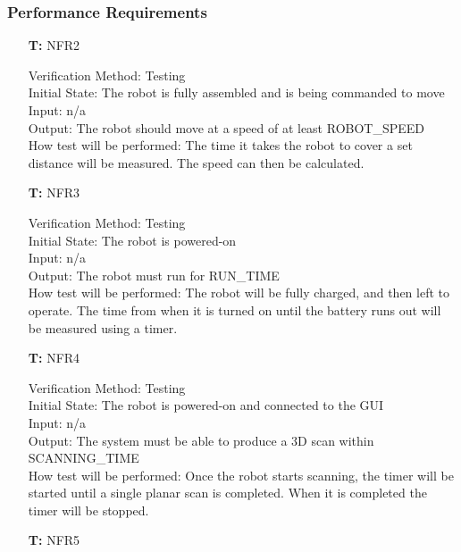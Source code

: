 \documentclass[12pt, titlepage]{article}
\newcounter{tnum} %
\begin{document}
\subsubsection{Performance Requirements}  
\begin{itemize}
  
\item[\textbf{T\refstepcounter{tnum}\thetnum:}]{NFR2\\}

Verification Method: Testing	\\				
Initial State: The robot is fully assembled and is being commanded to move	\\			
Input: n/a\\
Output: The robot should move at a speed of at least ROBOT\_SPEED \\
How test will be performed: The time it takes the robot to cover a set distance will be measured. The speed can then be calculated. \\
  
\item[\textbf{T\refstepcounter{tnum}\thetnum:}]{NFR3\\}

Verification Method: Testing	\\				
Initial State: The robot is powered-on	\\			
Input: n/a\\
Output: The robot must run for RUN\_TIME \\
How test will be performed: The robot will be fully charged, and then left to operate. The time from when it is turned on until the battery runs out will be measured using a timer. \\
			

\item[\textbf{T\refstepcounter{tnum}\thetnum:}]{NFR4\\}

Verification Method: Testing	\\				
Initial State: The robot is powered-on and connected to the GUI\\		
Input: n/a\\
Output: The system must be able to produce a 3D scan within SCANNING\_TIME \\
How test will be performed: Once the robot starts scanning, the timer will be started until a single planar scan is completed. When it is completed the timer will be stopped. \\

\item[\textbf{T\refstepcounter{tnum}\thetnum:}]{NFR5\\}


\end{itemize}
\end{document}
